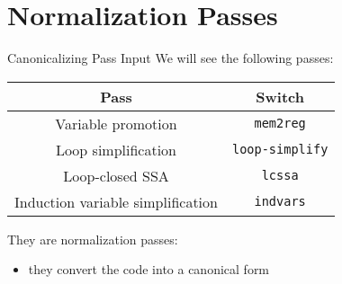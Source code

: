 
\section{Normalization Passes}


\begin{frame}{Canonicalizing Pass Input}
We will see the following passes:

\begin{table}
\centering
\begin{tabular}{cc}
\toprule

\multicolumn{1}{c}{\textbf{Pass}}    &
\multicolumn{1}{c}{\textbf{Switch}} \\

\midrule

Variable promotion  &
\texttt{mem2reg}   \\

Loop simplification &
\texttt{loop-simplify} \\

Loop-closed SSA  &
\texttt{lcssa}  \\

Induction variable simplification  &
\texttt{indvars}                  \\

\bottomrule
\end{tabular}
\end{table}

They are \alert{normalization} passes:

\begin{itemize}
\item they convert the code into a canonical form
\end{itemize}
\end{frame}




